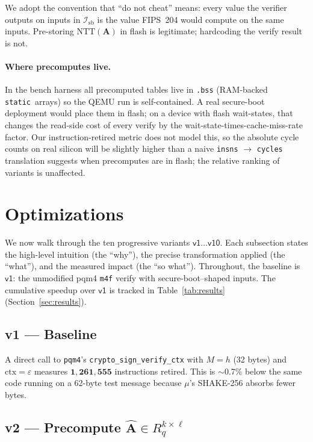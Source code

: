 \documentclass[11pt,a4paper]{article}
\newcommand{\Rq}{R_q}
\newcommand{\NTT}{\mathrm{NTT}}
\begin{document}
We adopt the convention that ``do not cheat'' means: every value the
verifier outputs on inputs in $\mathcal{I}_{\mathrm{sb}}$ is the value
FIPS~204 would compute on the same inputs. Pre-storing
$\NTT(\mathbf{A})$ in flash is legitimate; hardcoding the verify result
is not.

\paragraph{Where precomputes live.} In the bench harness all
precomputed tables live in \texttt{.bss} (RAM-backed
\texttt{static}~arrays) so the QEMU run is self-contained. A real
secure-boot deployment would place them in flash; on a device with
flash wait-states, that changes the read-side cost of every verify by
the wait-state-times-cache-miss-rate factor. Our instruction-retired
metric does not model this, so the absolute cycle counts on real
silicon will be slightly higher than a naive \texttt{insns} $\to$
\texttt{cycles} translation suggests when precomputes are in flash;
the relative ranking of variants is unaffected.

\section{Optimizations}
\label{sec:opts}

We now walk through the ten progressive variants
$\textsf{v1}\ldots\textsf{v10}$. Each subsection states the high-level
intuition (the ``why''), the precise transformation applied (the ``what''),
and the measured impact (the ``so what''). Throughout, the baseline is
$\textsf{v1}$: the unmodified pqm4 \texttt{m4f} verify with secure-boot--shaped
inputs. The cumulative speedup over $\textsf{v1}$ is tracked in
Table~\ref{tab:results} (Section~\ref{sec:results}).

\subsection{v1 --- Baseline}

A direct call to \texttt{pqm4}'s \texttt{crypto\_sign\_verify\_ctx} with
$M = h$ (32 bytes) and $\mathrm{ctx} = \varepsilon$ measures
$\mathbf{1{,}261{,}555}$ instructions retired. This is $\sim$0.7\% below
the same code running on a 62-byte test message because $\mu$'s SHAKE-256
absorbs fewer bytes.

\subsection{v2 --- Precompute \texorpdfstring{$\mathbf{\hat A} \in \Rq^{k\times\ell}$}{A in NTT}}
\end{document}
